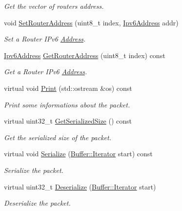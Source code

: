 \begin{DoxyCompactItemize}
\begin{DoxyCompactList}\small\item\em Get the vector of routers\textquotesingle{} address. \end{DoxyCompactList}\item 
void \hyperlink{classns3_1_1Ipv6ExtensionLooseRoutingHeader_aec81e612157334b09202d97083d44288}{Set\+Router\+Address} (uint8\+\_\+t index, \hyperlink{classns3_1_1Ipv6Address}{Ipv6\+Address} addr)
\begin{DoxyCompactList}\small\item\em Set a Router I\+Pv6 \hyperlink{classns3_1_1Address}{Address}. \end{DoxyCompactList}\item 
\hyperlink{classns3_1_1Ipv6Address}{Ipv6\+Address} \hyperlink{classns3_1_1Ipv6ExtensionLooseRoutingHeader_a04b5308f70567e65fdf48fd9117a61b6}{Get\+Router\+Address} (uint8\+\_\+t index) const 
\begin{DoxyCompactList}\small\item\em Get a Router I\+Pv6 \hyperlink{classns3_1_1Address}{Address}. \end{DoxyCompactList}\item 
virtual void \hyperlink{classns3_1_1Ipv6ExtensionLooseRoutingHeader_a0f9e2139702e73e5f2aee7a57e98c0f4}{Print} (std\+::ostream \&os) const 
\begin{DoxyCompactList}\small\item\em Print some informations about the packet. \end{DoxyCompactList}\item 
virtual uint32\+\_\+t \hyperlink{classns3_1_1Ipv6ExtensionLooseRoutingHeader_afb2883ef629c9219b3e1d0e2936d9462}{Get\+Serialized\+Size} () const 
\begin{DoxyCompactList}\small\item\em Get the serialized size of the packet. \end{DoxyCompactList}\item 
virtual void \hyperlink{classns3_1_1Ipv6ExtensionLooseRoutingHeader_a1061efc35027a488100b5af25de2012d}{Serialize} (\hyperlink{classns3_1_1Buffer_1_1Iterator}{Buffer\+::\+Iterator} start) const 
\begin{DoxyCompactList}\small\item\em Serialize the packet. \end{DoxyCompactList}\item 
virtual uint32\+\_\+t \hyperlink{classns3_1_1Ipv6ExtensionLooseRoutingHeader_af1345d6ac6b777807f09c03471a4a635}{Deserialize} (\hyperlink{classns3_1_1Buffer_1_1Iterator}{Buffer\+::\+Iterator} start)
\begin{DoxyCompactList}\small\item\em Deserialize the packet. \end{DoxyCompactList}\end{DoxyCompactItemize}
